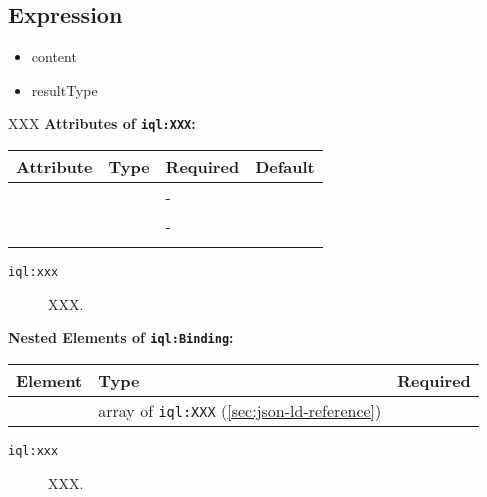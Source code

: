 \documentclass[11pt]{article}
\newcommand{\iqlns}{iql:}
\newcommand{\iqlType}[1]{\texttt{\iqlns#1}}
\newcommand{\attributes}[1]{\noindent\textbf{Attributes of \iqlType{#1}:}\newline\medskip}
\newcommand{\elements}[1]{\noindent\textbf{Nested Elements of \iqlType{#1}:}\newline\medskip}
\newcommand{\desc}[1]{\noindent#1\newline\medskip}
\begin{document}
\subsection{Expression}
\label{sec:json-ld-expression}
\begin{itemize}
\item content
\item resultType
\end{itemize}
\desc{XXX}
\attributes{XXX}
\begin{tabular}{|p{}|p{}|p{}|p{}|}
	\hline
	\textbf{Attribute} & \textbf{Type} & \textbf{Required} & \textbf{Default} \\ 
	\hline
	\hline
	&  & - &  \\ 
	\hline 
	&  & - &  \\ 
	\hline 
	&  &  & \\ 
	\hline 
\end{tabular}
\begin{description}
	\item[\iqlType{xxx}] XXX.
\end{description}
\elements{Binding}
\begin{tabular}{|p{}|p{}|p{}|}
	\hline
	\textbf{Element} & \textbf{Type} & \textbf{Required} \\ 
	\hline
	\hline 
	& array of \iqlType{XXX} (\ref{sec:json-ld-reference}) &  \\ 
	\hline 
\end{tabular}
\begin{description}
	\item[\iqlType{xxx}] XXX.
\end{description}

\end{document}
